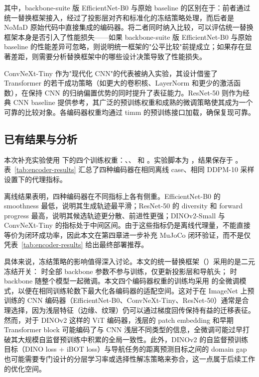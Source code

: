 其中，backbone-suite 版 EfficientNet-B0 与原始 baseline 的区别在于：前者通过统一替换框架接入，经过了投影层对齐和标准化的冻结策略处理，而后者是 NoMaD 原始代码中直接集成的编码器。将二者同时纳入比较，可以评估统一替换框架本身是否引入了性能损失——如果 backbone-suite 版 EfficientNet-B0 与原始 baseline 的性能差异可忽略，则说明统一框架的"公平比较"前提成立；如果存在显著差距，则需要分析替换框架中的哪些设计决策导致了性能损失。

ConvNeXt-Tiny\cite{convnext2022} 作为"现代化 CNN"的代表被纳入实验，其设计借鉴了 Transformer\cite{transformer2017} 的若干成功策略（如更大的卷积核、LayerNorm 和更少的激活函数），在保持 CNN 的归纳偏置优势的同时提升了表征能力。ResNet-50\cite{resnet2016} 则作为经典 CNN baseline 提供参考，其广泛的预训练权重和成熟的微调策略使其成为一个可靠的比较对象。各编码器权重均通过 timm\cite{timm2019} 的预训练接口加载，确保复现可靠。

\subsection{已有结果与分析}

本次补充实验使用  下的四个训练权重：、、 和 。实验脚本为 ，结果保存于 。表~\ref{tab:encoder-results} 汇总了四种编码器在相同离线 case、相同 DDPM-10 采样设置下的代理指标。

离线结果表明，四种编码器在不同指标上各有侧重。EfficientNet-B0 的 smoothness 最低，说明其生成轨迹最平滑；ResNet-50 的 diversity 和 forward progress 最高，说明其候选轨迹更分散、前进性更强；DINOv2-Small 与 ConvNeXt-Tiny 的指标处于中间区间。由于这些指标仍是离线代理量，不能直接等价为闭环成功率，因此本文在第四章进一步补充 MuJoCo 闭环验证，而不是仅凭表~\ref{tab:encoder-results} 给出最终部署推荐。

具体来说，冻结策略的影响值得深入讨论。本文的统一替换框架（）采用的是二元冻结开关： 时全部 backbone 参数不参与训练，仅更新投影层和导航头； 时 backbone 随整个模型一起微调。本文四个编码器权重的训练均采用  的全微调模式，以便在相同训练轮数下最大化各编码器的适配空间。这对于在 ImageNet 上预训练的 CNN 编码器（EfficientNet-B0、ConvNeXt-Tiny、ResNet-50）通常是合理选择，因为浅层特征（边缘、纹理）仍可以通过梯度回传保持有益的迁移表征。然而，对于 DINOv2 这样的 ViT 编码器，浅层的 patch embedding 和早期 Transformer block 可能编码了与 CNN 浅层不同类型的信息，全微调可能过早打破其大规模自监督预训练中积累的全局一致性。此外，DINOv2 的自监督预训练目标（DINO loss + iBOT loss）与导航任务的距离预测目标之间的 domain gap 也可能需要专门设计的分层学习率或选择性解冻策略来弥合，这一点属于后续工作的优化空间。

